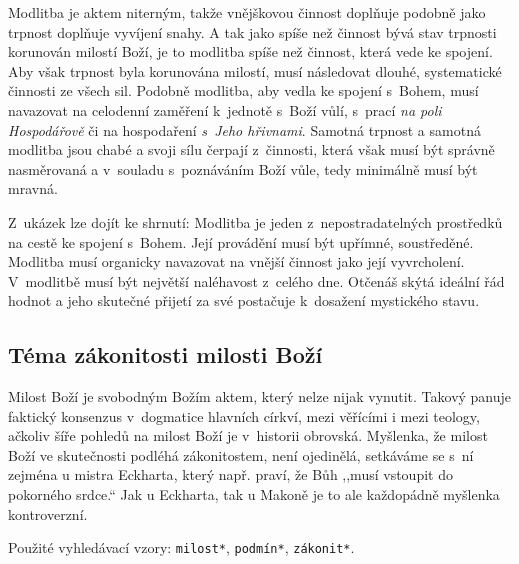 Modlitba je aktem niterným, takže vnějškovou činnost doplňuje podobně jako
trpnost doplňuje vyvíjení snahy. A tak jako spíše než činnost bývá stav trpnosti
korunován milostí Boží, je to modlitba spíše než činnost, která vede ke spojení.
Aby však trpnost byla korunována milostí, musí následovat dlouhé, systematické
činnosti ze všech sil. Podobně modlitba, aby vedla ke spojení s~Bohem, musí
navazovat na celodenní zaměření k~jednotě s~Boží vůlí, s~prací \textit{na poli
Hospodářově} či na hospodaření \textit{s~Jeho hřivnami}. Samotná trpnost a
samotná modlitba jsou chabé a svoji sílu čerpají z~činnosti, která však musí být
správně nasměrovaná a v~souladu s~poznáváním Boží vůle, tedy minimálně musí být
mravná.

Z~ukázek lze dojít ke shrnutí: Modlitba je jeden z~nepostradatelných prostředků
na cestě ke spojení s~Bohem. Její provádění musí být upřímné, soustředěné.
Modlitba musí organicky navazovat na vnější činnost jako její vyvrcholení.
V~modlitbě musí být největší naléhavost z~celého dne. Otčenáš skýtá ideální řád
hodnot a jeho skutečné přijetí za své postačuje k~dosažení mystického stavu.

\subsection{Téma zákonitosti milosti Boží}

Milost Boží je svobodným Božím aktem, který nelze nijak vynutit. Takový panuje
faktický konsenzus v~dogmatice hlavních církví, mezi věřícími i mezi teology,
ačkoliv šíře pohledů na milost Boží je v~historii
obrovská\cite{pinnock1989grace}\cite{studer1997grace}\cite{grace1965luther}.
Myšlenka, že milost Boží ve skutečnosti podléhá zákonitostem, není ojedinělá,
setkáváme se s~ní zejména u mistra Eckharta\cite{landauer1978eckhart}, který
např. praví, že Bůh ,,musí vstoupit do pokorného srdce.`` Jak u Eckharta, tak u
Makoně je to ale každopádně myšlenka kontroverzní.

Použité vyhledávací vzory:
\texttt{milost*},
\texttt{podmín*},
\texttt{zákonit*}.

